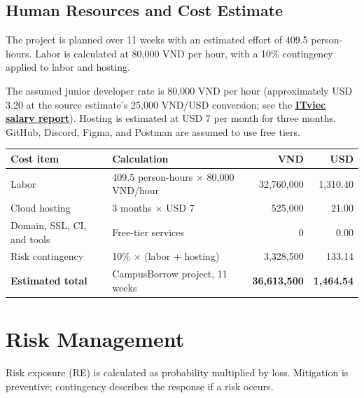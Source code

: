 \documentclass[11pt]{article}
\begin{document}
\subsection{Human Resources and Cost Estimate}
The project is planned over 11 weeks with an estimated effort of 409.5 person-hours. Labor is calculated at 80,000 VND per hour, with a 10\% contingency applied to labor and hosting.

The assumed junior developer rate is 80,000 VND per hour (approximately USD 3.20 at the source estimate's 25,000 VND/USD conversion; see the \href{https://itviec.com/blog/bao-cao-luong-it/}{\underline{\textbf{ITviec salary report}}}). Hosting is estimated at USD 7 per month for three months. GitHub, Discord, Figma, and Postman are assumed to use free tiers.

\begin{tabularx}{\textwidth}{@{}Y L{5.1cm}r r@{}}
\toprule
\textbf{Cost item} & \textbf{Calculation} & \textbf{VND} & \textbf{USD} \\
\midrule
Labor & 409.5 person-hours $\times$ 80,000 VND/hour & 32,760,000 & 1,310.40 \\
Cloud hosting & 3 months $\times$ USD 7 & 525,000 & 21.00 \\
Domain, SSL, CI, and tools & Free-tier services & 0 & 0.00 \\
Risk contingency & 10\% $\times$ (labor + hosting) & 3,328,500 & 133.14 \\
\textbf{Estimated total} & CampusBorrow project, 11 weeks & \textbf{36,613,500} & \textbf{1,464.54} \\
\bottomrule
\end{tabularx}


\section{Risk Management}
Risk exposure (RE) is calculated as probability multiplied by loss. Mitigation is preventive; contingency describes the response if a risk occurs.
\end{document}
